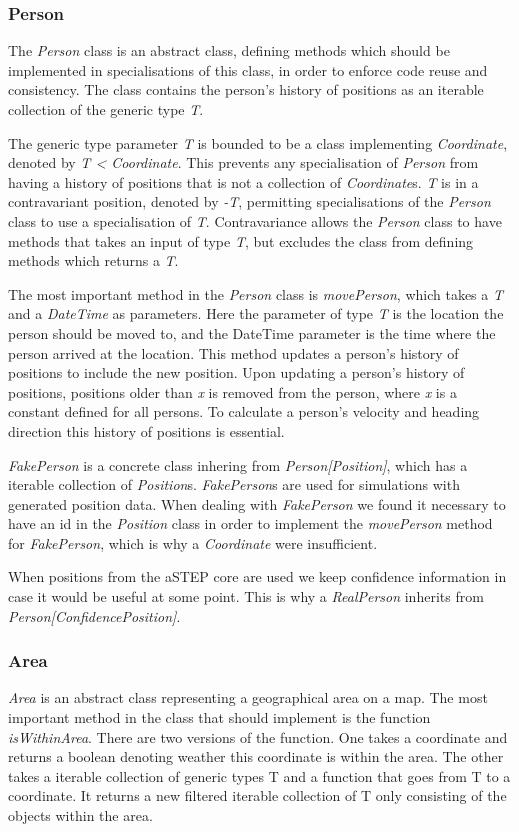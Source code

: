 \subsubsection{Person}
The \emph{Person} class is an abstract class, defining methods which should be implemented in specialisations of this class, in order to enforce code reuse and consistency. The class contains the person's history of positions as an iterable collection of the generic type \emph{T}. 

The generic type parameter \emph{T} is bounded to be a class implementing \emph{Coordinate}, denoted by \emph{T < Coordinate}. This prevents any specialisation of \emph{Person} from having a history of positions that is not a collection of \emph{Coordinate}s. \emph{T} is in a contravariant position, denoted by \emph{-T}, permitting specialisations of the \emph{Person} class to use a specialisation of \emph{T}. Contravariance allows the \emph{Person} class to have methods that takes an input of type \emph{T}, but excludes the class from defining methods which returns a \emph{T}. 

The most important method in the \emph{Person} class is \emph{movePerson}, which takes a \emph{T} and a \emph{DateTime} as parameters. Here the parameter of type \emph{T} is the location the person should be moved to, and the DateTime parameter is the time where the person arrived at the location. This method updates a person's history of positions to include the new position. Upon updating a person's history of positions, positions older than \emph{x} is removed from the person, where \emph{x} is a constant defined for all persons. To calculate a person's velocity and heading direction this history of positions is essential.

\emph{FakePerson} is a concrete class inhering from \emph{Person[Position]}, which has a iterable collection of \emph{Position}s. \emph{FakePerson}s are used for simulations with generated position data. When dealing with \emph{FakePerson} we found it necessary to have an id in the \emph{Position} class in order to implement the \emph{movePerson} method for \emph{FakePerson}, which is why a \emph{Coordinate} were insufficient. 

When positions from the aSTEP core are used we keep confidence information in case it would be useful at some point. This is why a \emph{RealPerson} inherits from \emph{Person[ConfidencePosition]}.

\subsubsection{Area}
\emph{Area} is an abstract class representing a geographical area on a map. The most important method in the class that should implement is the function \emph{isWithinArea}. There are two versions of the function. One takes a coordinate and returns a boolean denoting weather this coordinate is within the area. The other takes a iterable collection of generic types T and a function that goes from T to a coordinate. It returns a new filtered iterable collection of T only consisting of the objects within the area.

